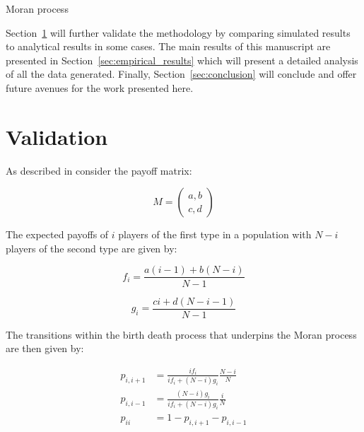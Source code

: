 \documentclass{article}
\begin{document}
\begin{algorithm}[!hbtp]
        \caption{Moran process}
        \label{alg:moran_process}
        
\end{algorithm}

Section~\ref{sec:validation} will further validate the methodology by comparing
simulated results to analytical results in some cases. The main results of this
manuscript are presented in Section~\ref{sec:empirical_results} which will
present a detailed analysis of all the data generated. Finally,
Section~\ref{sec:conclusion} will conclude and offer future avenues for the work
presented here.


\section{Validation}\label{sec:validation}

As described in \cite{Nowak} consider the payoff matrix:

\begin{equation}\label{equ:payoff_matrix}
    M = \begin{pmatrix}
        a, b\\
        c, d
        \end{pmatrix}
\end{equation}

The expected payoffs of \(i\) players of the first type in a population with \(N
- i\) players of the second type are given by:

\begin{equation}\label{equ:expected_payoff_one}
    f_i = \frac{a(i - 1) + b(N - i)}{N - 1}
\end{equation}

\begin{equation}\label{equ:expected_payoff_two}
    g_i = \frac{ci + d(N - i - 1)}{N - 1}
\end{equation}

The transitions within the birth death process that underpins the Moran process
are then given by:

\begin{align}
    p_{i, i+1}&= \frac{if_i}{if_i+(N-i)g_i}\frac{N-i}{N}\label{equ:p_up}\\
    p_{i, i-1}&= \frac{(N-i)g_i}{if_i+(N-i)g_i}\frac{i}{N}\label{equ:p_down}\\
    p_{ii} &= 1 - p_{i, i+1} - p_{i, i-1}\label{equ:p_stay}
\end{align}
\end{document}
